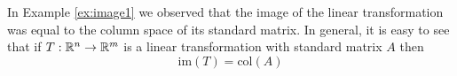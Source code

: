 \documentclass{ximera}
\begin{document}
\begin{general}
In Example \ref{ex:image1} we observed that the image of the linear transformation was equal to the column space of its standard matrix.  In general, it is easy to see that if $T:\mathbb{R}^n\rightarrow \mathbb{R}^m$ is a linear transformation with standard matrix $A$ then
$$\text{im}(T)=\text{col}(A)$$





\end{general}
\end{document}
